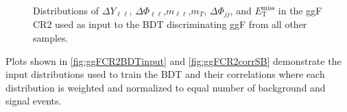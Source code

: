 \begin{figure}[!h]
{  }\hfill
{\caption{Distributions of $\Delta Y_{\ell\ell}$, $\Delta \Phi_{\ell\ell}$,$m_{\ell\ell}$,$m_T$, $\Delta \Phi_{jj}$, and $\ensuremath{E_{\text{T}}^{\text{miss}}}$ in the ggF CR2 used as input to the BDT discriminating ggF from all other samples.
\label{fig:ggFCR2}}}
\end{figure} 

Plots shown in \ref{fig:ggFCR2BDTinput} and \ref{fig:ggFCR2corrSB} demonstrate the input distributions used to train the BDT and their correlations where each distribution is weighted and normalized to equal number of background and signal events. 

